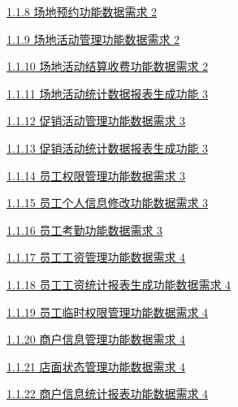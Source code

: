 \documentclass[]{article}
\begin{document}
\protect\hyperlink{ux573aux5730ux9884ux7ea6ux529fux80fdux6570ux636eux9700ux6c42}{1.1.8
  场地预约功能数据需求 2}

\protect\hyperlink{ux573aux5730ux6d3bux52a8ux7ba1ux7406ux529fux80fdux6570ux636eux9700ux6c42}{1.1.9
  场地活动管理功能数据需求 2}

\protect\hyperlink{ux573aux5730ux6d3bux52a8ux7ed3ux7b97ux6536ux8d39ux529fux80fdux6570ux636eux9700ux6c42}{1.1.10
  场地活动结算收费功能数据需求 2}

\protect\hyperlink{ux573aux5730ux6d3bux52a8ux7edfux8ba1ux6570ux636eux62a5ux8868ux751fux6210ux529fux80fd}{1.1.11
  场地活动统计数据报表生成功能 3}

\protect\hyperlink{ux4fc3ux9500ux6d3bux52a8ux7ba1ux7406ux529fux80fdux6570ux636eux9700ux6c42}{1.1.12
  促销活动管理功能数据需求 3}

\protect\hyperlink{ux4fc3ux9500ux6d3bux52a8ux7edfux8ba1ux6570ux636eux62a5ux8868ux751fux6210ux529fux80fd}{1.1.13
  促销活动统计数据报表生成功能 3}

\protect\hyperlink{ux5458ux5de5ux6743ux9650ux7ba1ux7406ux529fux80fdux6570ux636eux9700ux6c42}{1.1.14
  员工权限管理功能数据需求 3}

\protect\hyperlink{ux5458ux5de5ux4e2aux4ebaux4fe1ux606fux4feeux6539ux529fux80fdux6570ux636eux9700ux6c42}{1.1.15
  员工个人信息修改功能数据需求 3}

\protect\hyperlink{ux5458ux5de5ux8003ux52e4ux529fux80fdux6570ux636eux9700ux6c42}{1.1.16
  员工考勤功能数据需求 3}

\protect\hyperlink{ux5458ux5de5ux5de5ux8d44ux7ba1ux7406ux529fux80fdux6570ux636eux9700ux6c42}{1.1.17
  员工工资管理功能数据需求 4}

\protect\hyperlink{ux5458ux5de5ux5de5ux8d44ux7edfux8ba1ux62a5ux8868ux751fux6210ux529fux80fdux6570ux636eux9700ux6c42}{1.1.18
  员工工资统计报表生成功能数据需求 4}

\protect\hyperlink{ux5458ux5de5ux4e34ux65f6ux6743ux9650ux7ba1ux7406ux529fux80fdux6570ux636eux9700ux6c42}{1.1.19
  员工临时权限管理功能数据需求 4}

\protect\hyperlink{ux5546ux6237ux4fe1ux606fux7ba1ux7406ux529fux80fdux6570ux636eux9700ux6c42}{1.1.20
  商户信息管理功能数据需求 4}

\protect\hyperlink{ux5e97ux9762ux72b6ux6001ux7ba1ux7406ux529fux80fdux6570ux636eux9700ux6c42}{1.1.21
  店面状态管理功能数据需求 4}

\protect\hyperlink{ux5546ux6237ux4fe1ux606fux7edfux8ba1ux62a5ux8868ux529fux80fdux6570ux636eux9700ux6c42}{1.1.22
  商户信息统计报表功能数据需求 4}
\end{document}
